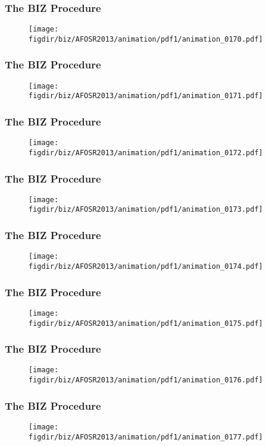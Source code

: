 \documentclass[13pt]{beamer}
\newcommand{\figdir}{../../fig}
\begin{document}
\begin{frame}\frametitle{The BIZ Procedure}\begin{figure}\texttt{[image: \\figdir/biz/AFOSR2013/animation/pdf1/animation\_0170.pdf]}\end{figure}\end{frame}
\begin{frame}\frametitle{The BIZ Procedure}\begin{figure}\texttt{[image: \\figdir/biz/AFOSR2013/animation/pdf1/animation\_0171.pdf]}\end{figure}\end{frame}
\begin{frame}\frametitle{The BIZ Procedure}\begin{figure}\texttt{[image: \\figdir/biz/AFOSR2013/animation/pdf1/animation\_0172.pdf]}\end{figure}\end{frame}
\begin{frame}\frametitle{The BIZ Procedure}\begin{figure}\texttt{[image: \\figdir/biz/AFOSR2013/animation/pdf1/animation\_0173.pdf]}\end{figure}\end{frame}
\begin{frame}\frametitle{The BIZ Procedure}\begin{figure}\texttt{[image: \\figdir/biz/AFOSR2013/animation/pdf1/animation\_0174.pdf]}\end{figure}\end{frame}
\begin{frame}\frametitle{The BIZ Procedure}\begin{figure}\texttt{[image: \\figdir/biz/AFOSR2013/animation/pdf1/animation\_0175.pdf]}\end{figure}\end{frame}
\begin{frame}\frametitle{The BIZ Procedure}\begin{figure}\texttt{[image: \\figdir/biz/AFOSR2013/animation/pdf1/animation\_0176.pdf]}\end{figure}\end{frame}
\begin{frame}\frametitle{The BIZ Procedure}\begin{figure}\texttt{[image: \\figdir/biz/AFOSR2013/animation/pdf1/animation\_0177.pdf]}\end{figure}\end{frame}
\end{document}
